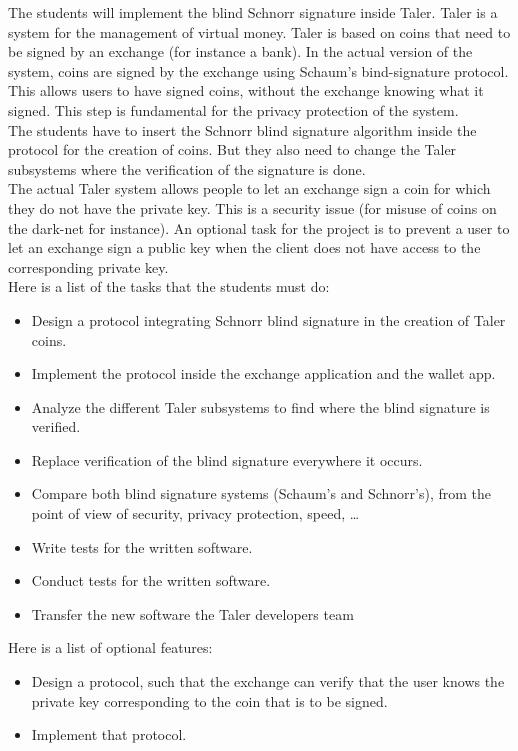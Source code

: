 The students will implement the blind Schnorr signature inside Taler.
Taler is a system for the management of virtual money.
Taler is based on coins that need to be signed by an exchange (for instance a bank).
In the actual version of the system, coins are signed by the exchange using Schaum's bind-signature protocol.
This allows users to have signed coins, without the exchange knowing what it signed.
This step is fundamental for the privacy protection of the system.
\\The students have to insert the Schnorr blind signature algorithm inside the protocol for the creation of coins.
But they also need to change the Taler subsystems where the verification of the signature is done.
\\The actual Taler system allows people to let an exchange sign a coin for which they do not have the private key.
This is a security issue (for misuse of coins on the dark-net for instance).
An optional task for the project is to prevent a user to let an exchange sign a public key when the client does not have access to the corresponding private key.
\\Here is a list of the tasks that the students must do:
\begin{itemize}
    \item Design a protocol integrating Schnorr blind signature in the creation of Taler coins.
    \item Implement the protocol inside the exchange application and the wallet app.
    \item Analyze the different Taler subsystems to find where the blind signature is verified.
    \item Replace verification of the blind signature everywhere it occurs.
    \item Compare both blind signature systems (Schaum's and Schnorr's), from the point of view of security, privacy protection, speed, \dots
    \item Write tests for the written software.
    \item Conduct tests for the written software.
    \item Transfer the new software the Taler developers team
\end{itemize}
Here is a list of optional features:
\begin{itemize}
    \item Design a protocol, such that the exchange can verify that the user knows the private key corresponding to the coin that is to be signed.
    \item Implement that protocol.
\end{itemize}

